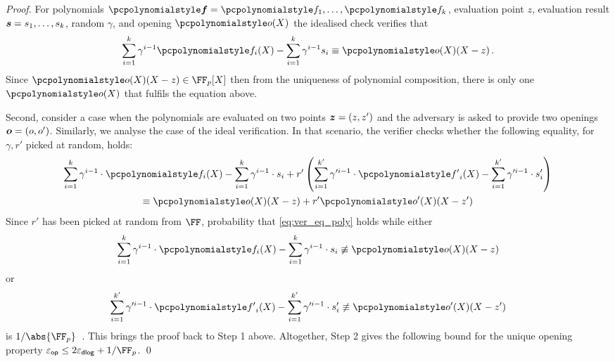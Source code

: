 \documentclass[runningheads,10pt]{llncs}
\let\spvec\vec
\let\vec\accentvec
\let\spvec\vec
\let\vec\spvec
\def\vec#1{\mathchoice{\mbox{\boldmath$\displaystyle#1$}}
  {\mbox{\boldmath$\textstyle#1$}} {\mbox{\boldmath$\scriptstyle#1$}}
  {\mbox{\boldmath$\scriptscriptstyle#1$}}}
\begin{document}
\begin{proof}
For polynomials $\vec{\p{f}} = \p{f}_1, \ldots, \p{f}_k$, evaluation point $z$, evaluation
result $\vec{s} = s_1, \ldots, s_k$, random $\gamma$, and opening $\p{o}(X)$ the
idealised check verifies that
\begin{equation}
	\sum_{i = 1}^k \gamma^{i - 1} \p{f}_i(X) - \sum_{i = 1}^{k} \gamma^{i - 1} s_i \equiv \p{o}(X) (X - z)\,.
	\label{eq:pcom_idealised_check}
\end{equation}
Since $\p{o}(X)(X - z) \in \FF_p[X]$ then from the uniqueness of polynomial
composition, there is only one $\p{o} (X)$ that fulfils the equation above.

 Second, consider a case when the polynomials are evaluated on two
points $\vec{z} = (z, z')$ and the adversary is asked to provide two openings
$\vec{o} = (o, o')$. Similarly, we analyse the case of the ideal verification.
In that scenario, the verifier checks whether the following equality, for
$\gamma, r'$ picked at random, holds:
\begin{multline}
	\label{eq:ver_eq_poly}
	\sum_{i = 1}^{k} \gamma^{i - 1} \cdot \p{f}_i(X) - \sum_{i = 1}^{k} \gamma^{i - 1} \cdot s_i  + r' \left(\sum_{i = 1}^{k'} \gamma'^{i - 1} \cdot \p{f'}_i(X) - \sum_{i = 1}^{k'} \gamma'^{i - 1} \cdot s'_i \right)\\
	\equiv \p{o}(X)(X - z) + r' \p{o}'(X)(X- z')
\end{multline}
Since $r'$ has been picked at random from $\FF$, probability that \cref{eq:ver_eq_poly}
holds while either
\[
	\sum_{i = 1}^{k} \gamma^{i - 1} \cdot \p{f}_i(X) - \sum_{i = 1}^{k}  \gamma^{i - 1} \cdot s_i \not\equiv \p{o}(X)(X - z)
\]
or 
\[
	\sum_{i = 1}^{k'} \gamma'^{i - 1} \cdot \p{f'}_i(X) - \sum_{i = 1}^{k'} \gamma'^{i - 1} \cdot s'_i \not\equiv \p{o'}(X)(X - z')
\]
is $\infrac{1}{\abs{\FF_p}}$~\cite{EPRINT:GabWilCio19}. This brings the proof back to
Step 1 above. Altogether, Step 2 gives the following bound for the unique
opening property $\epsop \leq 2\epsdlog + \infrac{1}{\FF_p}$.
\qed
\end{proof}
\end{document}
